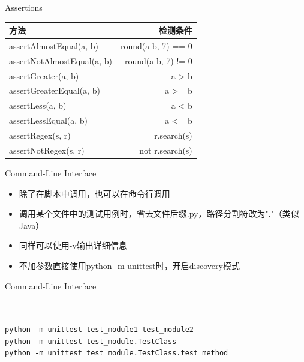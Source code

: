 \documentclass{beamer}
\begin{document}
\begin{frame}[t]{Assertions}
    \begin{table}
        \begin{tabular}{lr}
            \hline
            方法           & 检测条件           \\
            \hline
assertAlmostEqual(a, b)    & round(a-b, 7) == 0 \\
assertNotAlmostEqual(a, b) & round(a-b, 7) != 0 \\
assertGreater(a, b)        & a > b              \\
assertGreaterEqual(a, b)   & a >= b             \\
assertLess(a, b)           & a < b              \\
assertLessEqual(a, b)      & a <= b             \\
assertRegex(s, r)          & r.search(s)        \\
assertNotRegex(s, r)       & not r.search(s)    \\
            \hline
        \end{tabular}
    \end{table}
\end{frame}


\begin{frame}[t]{Command-Line Interface}

    \begin{itemize}
        \item 除了在脚本中调用，也可以在命令行调用
        \item 调用某个文件中的测试用例时，省去文件后缀.py，路径分割符改为"."（类似Java）
        \item 同样可以使用-v输出详细信息
        \item 不加参数直接使用python -m unittest时，开启discovery模式
    \end{itemize}

\end{frame}


\begin{frame}[t,fragile]{Command-Line Interface}


\begin{verbatim}


python -m unittest test_module1 test_module2
python -m unittest test_module.TestClass
python -m unittest test_module.TestClass.test_method


\end{verbatim}


\end{frame}
\end{document}
